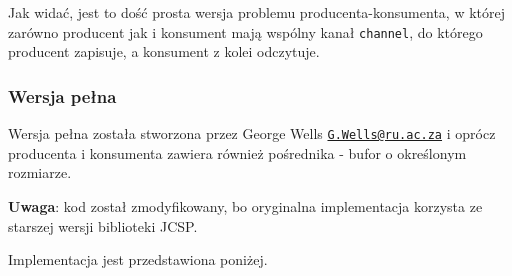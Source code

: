 \documentclass[11pt]{article}
\begin{document}
    Jak widać, jest to dość prosta wersja problemu producenta-konsumenta, w
której zarówno producent jak i konsument mają wspólny kanał
\texttt{channel}, do którego producent zapisuje, a konsument z kolei
odczytuje.

    \hypertarget{wersja-peux142na}{%
\subsubsection{Wersja pełna}\label{wersja-peux142na}}

Wersja pełna została stworzona przez George Wells
\href{mailto:G.Wells@ru.ac.za}{\nolinkurl{G.Wells@ru.ac.za}} i oprócz
producenta i konsumenta zawiera również pośrednika - bufor o określonym
rozmiarze.

\textbf{Uwaga}: kod został zmodyfikowany, bo oryginalna implementacja
korzysta ze starszej wersji biblioteki JCSP.

Implementacja jest przedstawiona poniżej.
\end{document}
